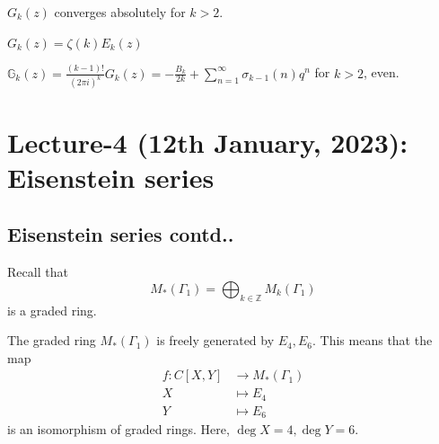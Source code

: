 \documentclass[oneside, 12pt, ]{scrbook}
\newcommand{\ZZ}{\mathbb Z}
\theoremstyle{theorem}
\begin{document}
\begin{proposition}
$G_{k}(z)$ converges absolutely for $k>2$.
\end{proposition} 

\begin{proposition}
$G_{k}(z) = \zeta(k) E_{k}(z)$
\end{proposition}

\begin{proposition}
$\mathbb{G}_{k}(z) = \frac{(k-1)!}{(2 \pi i)^k} G_{k}(z) = -\frac{B_{k}}{2k} + \sum_{n=1}^{\infty} \sigma_{k-1}(n)q^n$ for $k>2$, even.
\end{proposition}

\chapter{Lecture-4 (12th January, 2023): Eisenstein series}

\section{Eisenstein series contd..}

Recall that $$M_{*}(\Gamma_{1}) = \bigoplus_{k \in \ZZ}M_{k}(\Gamma_{1})$$  is a graded ring.

\begin{proposition}
The graded ring $M_{*}(\Gamma_{1})$ is freely generated by $E_{4},E_{6}$. This means that the map 
\begin{align*}
f: C[X,Y] &\rightarrow M_{*}(\Gamma_{1})\\
X &\mapsto E_{4} \\
Y &\mapsto E_{6}
\end{align*}
is an isomorphism of graded rings. Here, $\deg X = 4, \deg Y=6$. 
\end{proposition}
\end{document}
